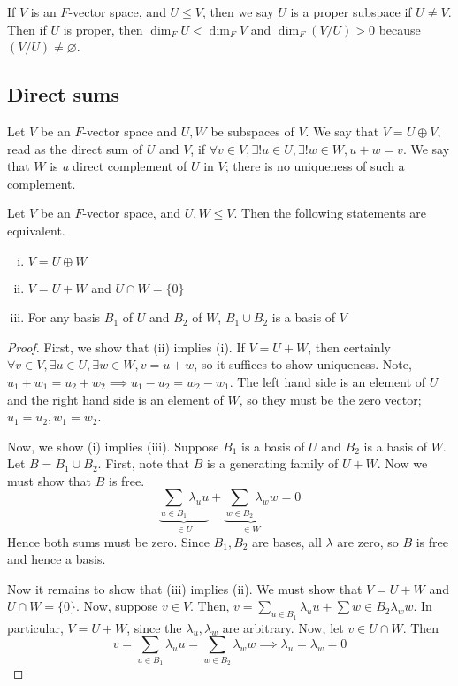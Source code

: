 \begin{remark}
	If \( V \) is an \( F \)-vector space, and \( U \leq V \), then we say \( U \) is a proper subspace if \( U \neq V \).
	Then if \( U \) is proper, then \( \dim_F U < \dim_F V \) and \( \dim_F ( V / U ) > 0 \) because \( (V/U) \neq \varnothing \).
\end{remark}

\subsection{Direct sums}
\begin{definition}
	Let \( V \) be an \( F \)-vector space and \( U, W \) be subspaces of \( V \).
	We say that \( V = U \oplus V \), read as the direct sum of \( U \) and \( V \), if \( \forall v \in V, \exists!
	u \in U, \exists!
	w \in W, u + w = v \).
	We say that \( W \) is \textit{a} direct complement of \( U \) in \( V \); there is no uniqueness of such a complement.
\end{definition}
\begin{lemma}
	Let \( V \) be an \( F \)-vector space, and \( U, W \leq V \).
	Then the following statements are equivalent.
	\begin{enumerate}[(i)]
		\item \( V = U \oplus W \)
		\item \( V = U + W \) and \( U \cap W = \{0\} \)
		\item For any basis \( B_1 \) of \( U \) and \( B_2 \) of \( W \), \( B_1 \cup B_2 \) is a basis of \( V \)
	\end{enumerate}
\end{lemma}
\begin{proof}
	First, we show that (ii) implies (i).
	If \( V = U + W \), then certainly \( \forall v \in V, \exists u \in U, \exists w \in W, v = u + w \), so it suffices to show uniqueness.
	Note, \( u_1 + w_1 = u_2 + w_2 \implies u_1 - u_2 = w_2 - w_1 \).
	The left hand side is an element of \( U \) and the right hand side is an element of \( W \), so they must be the zero vector; \( u_1 = u_2, w_1 = w_2 \).

	Now, we show (i) implies (iii).
	Suppose \( B_1 \) is a basis of \( U \) and \( B_2 \) is a basis of \( W \).
	Let \( B = B_1 \cup B_2 \).
	First, note that \( B \) is a generating family of \( U + W \).
	Now we must show that \( B \) is free.
	\[
		\underbrace{\sum_{u \in B_1} \lambda_u u}_{\in U} + \underbrace{\sum_{w \in B_2} \lambda_w w}_{\in W} = 0
	\]
	Hence both sums must be zero.
	Since \( B_1, B_2 \) are bases, all \( \lambda \) are zero, so \( B \) is free and hence a basis.

	Now it remains to show that (iii) implies (ii).
	We must show that \( V = U + W \) and \( U \cap W = \{0\} \).
	Now, suppose \( v \in V \).
	Then, \( v = \sum_{u \in B_1} \lambda_u u + \sum{w \in B_2} \lambda_w w \).
	In particular, \( V = U + W \), since the \( \lambda_u, \lambda_w \) are arbitrary.
	Now, let \( v \in U \cap W \).
	Then
	\[
		v = \sum_{u \in B_1} \lambda_u u = \sum_{w \in B_2} \lambda_w w \implies \lambda_u = \lambda_w = 0
	\]
\end{proof}

